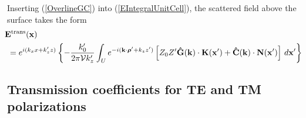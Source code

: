 \documentclass[letterpaper]{article}
\begin{document}
Inserting (\ref{OverlineGC}) into (\ref{EIntegralUnitCell}), 
the scattered field above the surface takes the form
\begin{align}
 &\hspace{-0.05in} \vb E\sups{trans}(\vb x)
\nn
&=
 e^{i(k_x x + k_z^\prime z)}
        \left\{ -\frac{k_0^\prime}{2\pi \mc V k_z^\prime}
        \int_U e^{-i(\vb k \cdot \vbrho^\prime + k_z z^\prime)}
        \left[ Z_0 Z^\prime \vbhat{G}(\vb k)\cdot \vb K(\vb x^\prime)
                +\vbhat{C}(\vb k)\cdot \vb N(\vb x^\prime)
        \right] \, d\vb x^\prime
        \right\}
\label{ETransSurfaceIntegral}
\end{align}

\subsection*{Transmission coefficients for TE and TM polarizations}
\end{document}
